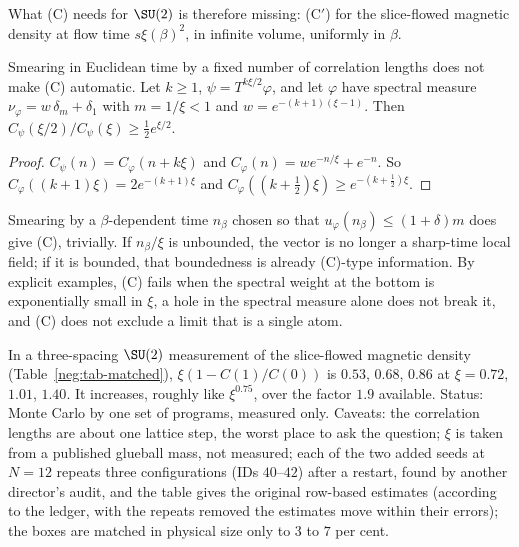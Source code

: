 What (C) needs for $\SU(2)$ is therefore missing: (C$'$) for the slice-flowed magnetic density at
flow time $s\xi(\beta)^2$, in infinite volume, uniformly in $\beta$.

\begin{proposition}\label{neg:prop-smear}
Smearing in Euclidean time by a fixed number of correlation lengths does not make (C)
automatic. Let $k\ge1$, $\psi=T^{k\xi/2}\varphi$, and let $\varphi$ have spectral measure
$\nu_\varphi=w\,\delta_m+\delta_1$ with $m=1/\xi<1$ and $w=e^{-(k+1)(\xi-1)}$. Then
$C_\psi(\xi/2)/C_\psi(\xi)\ge\frac12e^{\xi/2}$.
\end{proposition}

\begin{proof}
$C_\psi(n)=C_\varphi(n+k\xi)$ and $C_\varphi(n)=we^{-n/\xi}+e^{-n}$. So
$C_\varphi((k+1)\xi)=2e^{-(k+1)\xi}$ and $C_\varphi((k+\frac12)\xi)\ge e^{-(k+\frac12)\xi}$.
\end{proof}

Smearing by a $\beta$-dependent time $n_\beta$ chosen so that $u_\varphi(n_\beta)\le(1+\delta)m$
does give (C), trivially. If $n_\beta/\xi$ is unbounded, the vector is no longer a sharp-time
local field; if it is bounded, that boundedness is already (C)-type information. By explicit
examples, (C) fails when the spectral weight at the bottom is exponentially small in $\xi$, a
hole in the spectral measure alone does not break it, and (C) does not exclude a limit that is a
single atom.

\begin{observation}\label{neg:obs-matched}
In a three-spacing $\SU(2)$ measurement of the slice-flowed magnetic density
(Table~\ref{neg:tab-matched}), $\xi(1-C(1)/C(0))$ is $0.53$, $0.68$, $0.86$ at $\xi=0.72$, $1.01$,
$1.40$. It increases, roughly like $\xi^{0.75}$, over the factor $1.9$ available. Status: Monte
Carlo by one set of programs, measured only. Caveats: the correlation lengths are about one lattice
step, the worst place to ask the question; $\xi$ is taken from a published glueball mass, not
measured; each of the two added seeds at $N=12$ repeats three configurations (IDs $40$--$42$)
after a restart, found by another director's audit, and the table gives the original
row-based estimates (according to the ledger, with the repeats removed the estimates move
within their errors); the boxes are matched in physical size only to $3$ to $7$ per cent.
\end{observation}

